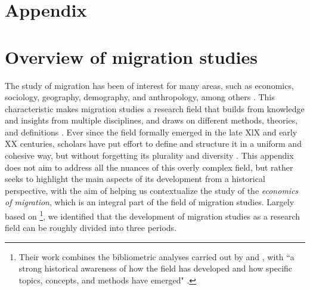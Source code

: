 \appendix
\section*{Appendix}

\section{Overview of migration studies} \label{migration_studies}

The study of migration has been of interest for many areas, such as economics, sociology, geography, demography, and anthropology, among others \citep{cohen_introduction_1996, brettell_introduction_2015}. This characteristic makes migration studies a research field that builds from knowledge and insights from multiple disciplines, and draws on different methods, theories, and definitions \citep{scholten_introduction_2022, brettell_introduction_2015, king_theories_2012}. Ever since the field formally emerged in the late XlX and early XX centuries, scholars have put effort to define and structure it in a uniform and cohesive way, but without forgetting its plurality and diversity \citep{scholten_introduction_2022}. This appendix does not aim to address all the nuances of this overly complex field, but rather seeks to highlight the main aspects of its development from a historical perspective, with the aim of helping us contextualize the study of the \textit{economics of migration}, which is an integral part of the field of migration studies. Largely based on \cite[p. 9-21]{scholten_introduction_2022}\footnote{Their work combines the bibliometric analyses carried out by \cite{levy_between_2020} and \cite{pisarevskaya_mapping_2020}, with ``a strong historical awareness of how the field has developed and how specific topics, concepts, and methods have emerged" \citep[p. 5]{scholten_introduction_2022}.}, we identified that the development of migration studies as a research field can be roughly divided into three periods.

